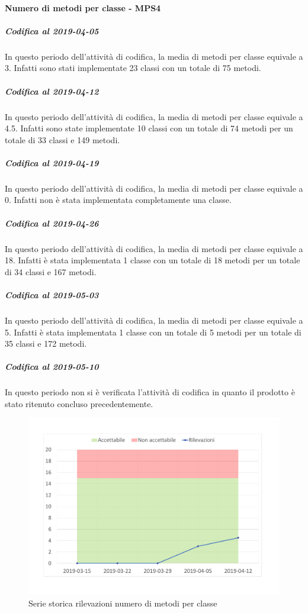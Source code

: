 \paragraph{Numero di metodi per classe - MPS4}
\subparagraph{Codifica al 2019-04-05}
In questo periodo dell'attività di codifica, la media di metodi per classe equivale a 3. Infatti sono stati implementate 23 classi con un totale di 75 metodi.

\subparagraph{Codifica al 2019-04-12}
In questo periodo dell'attività di codifica, la media di metodi per classe equivale a 4.5. Infatti sono state implementate 10 classi con un totale di 74 metodi per un totale di 33 classi e 149 metodi.

\subparagraph{Codifica al 2019-04-19}
In questo periodo dell'attività di codifica, la media di metodi per classe equivale a 0. Infatti non è stata implementata completamente una classe.

\subparagraph{Codifica al 2019-04-26}
In questo periodo dell'attività di codifica, la media di metodi per classe equivale a 18. Infatti è stata implementata 1 classe con un totale di 18 metodi per un totale di 34 classi e 167 metodi.

\subparagraph{Codifica al 2019-05-03}
In questo periodo dell'attività di codifica, la media di metodi per classe equivale a 5. Infatti è stata implementata 1 classe con un totale di 5 metodi per un totale di 35 classi e 172 metodi.

\subparagraph{Codifica al 2019-05-10}
In questo periodo non si è verificata l'attività di codifica in quanto il prodotto è stato ritenuto concluso precedentemente.

\begin{figure}[H]
	\centering
	\includegraphics[scale=0.6]{images/resoconto/MPS4Chart.pdf}
	\caption{Serie storica rilevazioni numero di metodi per classe}	
\end{figure}

